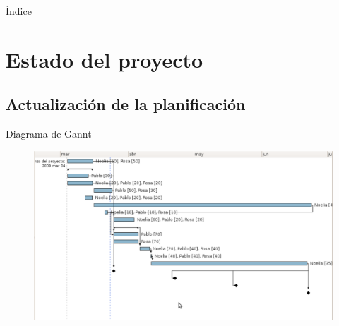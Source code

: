 \documentclass[9pt,xcolor=svgnames]{beamer}
\begin{document}


\begin{frame}
 \titlepage
\end{frame}

\normalsize

\begin{frame}{Índice} 
 \transdissolve
 \tableofcontents
\end{frame}
  
  
 \section{Estado del proyecto}
 
  \subsection{Actualización de la planificación}
  
  \begin{frame}{Diagrama de Gannt}
   
   \begin{figure}[t]
    \includegraphics[scale=0.27]{./Imagenes/gannt.pdf}
   \end{figure}
   
  \end{frame}
  
\end{document}
